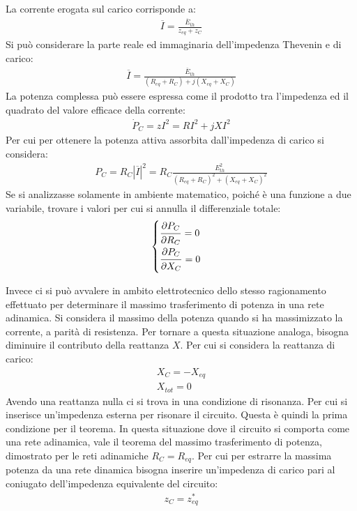 \documentclass{article}
\numberwithin{equation}{subsection}
\begin{document}
La corrente erogata sul carico corrisponde a:
\begin{gather*}
    \overline{I}=\displaystyle\frac{\overline{E}_{th}}{z_{eq}+z_C}
\end{gather*}
Si può considerare la parte reale ed immaginaria dell'impedenza Thevenin e di carico:
\begin{gather*}
    \overline{I}=\displaystyle\frac{\overline{E}_{th}}{(R_{eq}+R_{C})+j(X_{eq}+X_C)}
\end{gather*}
La potenza complessa può essere espressa come il prodotto tra l'impedenza ed il quadrato del valore efficace della corrente:
\begin{gather*}
    \dot P_C=zI^2=RI^2+jXI^2
\end{gather*}
Per cui per ottenere la potenza attiva assorbita dall'impedenza di carico si considera:
\begin{gather*}
    P_C=R_C|\overline I|^2=R_C\displaystyle\frac{E_{th}^2}{(R_{eq}+R_C)^2+(X_{eq}+X_C)^2}
\end{gather*}
Se si analizzasse solamente in ambiente matematico, poiché è una funzione a due variabile, trovare i valori per cui si annulla il differenziale totale:
\begin{gather*}
    \begin{cases}
        \displaystyle\frac{\strut \partial P_C}{\strut \partial R_C}=0\\
        \displaystyle\frac{\strut \partial P_C}{\strut \partial X_C}=0
    \end{cases}
\end{gather*}

Invece ci si può avvalere in ambito elettrotecnico dello stesso ragionamento effettuato per determinare il massimo trasferimento di potenza in una rete adinamica. Si 
considera il massimo della potenza quando si ha massimizzato la corrente, a parità di resistenza. Per tornare a questa situazione analoga, bisogna diminuire il contributo 
della reattanza $X$. Per cui si considera la reattanza di carico:
\begin{gather*}
    X_C=-X_{eq}\\
    X_{tot}=0
\end{gather*}
Avendo una reattanza nulla ci si trova in una condizione di risonanza. Per cui si inserisce un'impedenza esterna per risonare il circuito. Questa è quindi la prima 
condizione per il teorema. In questa situazione dove il circuito si comporta come una rete adinamica, vale il teorema del massimo trasferimento di potenza, dimostrato 
per le reti adinamiche $R_C=R_{eq}$. 
Per cui per estrarre la massima potenza da una rete dinamica bisogna inserire un'impedenza di carico pari al coniugato dell'impedenza equivalente del circuito:
\begin{gather*}
    z_C=z_{eq}^*
\end{gather*}
\end{document}
